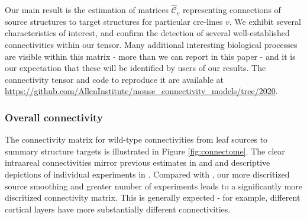 Our main result is the estimation of matrices $\hat {\mathcal C}_v$ representing connections of source structures to target structures for particular cre-lines $v$. 
We exhibit several characteristics of interest, and confirm the detection of several well-established connectivities within our tensor.
Many additional interesting biological processes are visible within this matrix - more than we can report in this paper - and it is our expectation that these will be identified by users of our results.
The connectivity tensor and code to reproduce it are available at \url{https://github.com/AllenInstitute/mouse_connectivity_models/tree/2020}.

\subsubsection{Overall connectivity}

The connectivity matrix for wild-type connectivities from leaf sources to summary structure targets is illustrated in Figure \ref{fig:connectome}.
The clear intraareal connectivities mirror previous estimates in \citet{Oh2014-kh} and \citet{Knox2019-ot} and descriptive depictions of individual experiments in \citet{Harris2019-mr}.
Compared with \citet{Knox2019-ot}, our more discritized source smoothing and greater number of experiments leads to a significantly more discritized connectivity matrix.
This is generally expected - for example, different cortical layers have more substantially different connectivities.


\newpage

\begin{figure}[H]
\centering
\end{figure}

